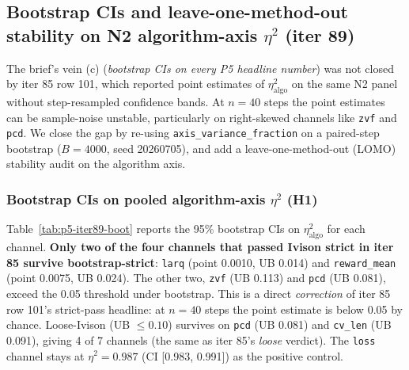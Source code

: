 \subsection{Bootstrap CIs and leave-one-method-out stability on N2 algorithm-axis $\eta^2$ (iter 89)}
\label{sec:p5-iter89-n2-bootstrap}

The brief's vein (c) (\emph{bootstrap CIs on every P5 headline number})
was not closed by iter 85 row 101, which reported point estimates of
$\eta^2_{\mathrm{algo}}$ on the same N2 panel without step-resampled
confidence bands. At $n{=}40$ steps the point estimates can be
sample-noise unstable, particularly on right-skewed channels like
\texttt{zvf} and \texttt{pcd}. We close the gap by re-using
\texttt{axis\_variance\_fraction} on a paired-step bootstrap
($B{=}4000$, seed 20260705), and add a leave-one-method-out (LOMO)
stability audit on the algorithm axis.

\subsubsection{Bootstrap CIs on pooled algorithm-axis $\eta^2$ (H1)}
\label{sec:p5-iter89-h1}
Table~\ref{tab:p5-iter89-boot} reports the 95\% bootstrap CIs on
$\eta^2_{\mathrm{algo}}$ for each channel. \textbf{Only two of the
four channels that passed Ivison strict in iter 85 survive
bootstrap-strict}: \texttt{larq} (point 0.0010, UB 0.014) and
\texttt{reward\_mean} (point 0.0075, UB 0.024). The other two,
\texttt{zvf} (UB 0.113) and \texttt{pcd} (UB 0.081), exceed the
0.05 threshold under bootstrap. This is a direct \emph{correction}
of iter 85 row 101's strict-pass headline: at $n{=}40$ steps the
point estimate is below 0.05 by chance. Loose-Ivison (UB
$\leq 0.10$) survives on \texttt{pcd} (UB 0.081) and
\texttt{cv\_len} (UB 0.091), giving 4 of 7 channels (the same as
iter 85's \emph{loose} verdict). The \texttt{loss} channel stays
at $\eta^2{=}0.987$ (CI [0.983, 0.991]) as the positive control.

